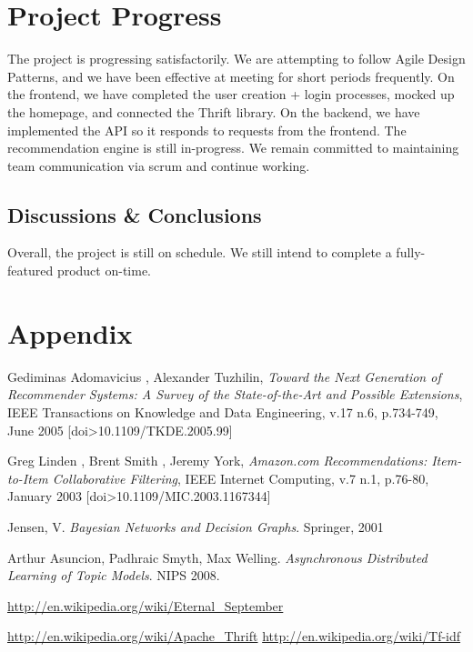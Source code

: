 \documentclass[11pt,letterpaper]{article}
\begin{document}
\section{Project Progress}
The project is progressing satisfactorily.
We are attempting to follow Agile Design Patterns, and we have been effective at meeting for short periods frequently.
On the frontend, we have completed the user creation + login processes, mocked up the homepage, and connected the Thrift library.
On the backend, we have implemented the API so it responds to requests from the frontend. The recommendation engine is still in-progress.
We remain committed to maintaining team communication via scrum and continue working.

\subsection{Discussions \& Conclusions}
Overall, the project is still on schedule. We still intend to complete a fully-featured product on-time.

\section{Appendix}

\newpage
\newpage
\begin{thebibliography}{6}
   Gediminas Adomavicius , Alexander Tuzhilin, \textit{Toward the Next Generation of Recommender Systems: A Survey of the State-of-the-Art and Possible Extensions}, IEEE Transactions on Knowledge and Data Engineering, v.17 n.6, p.734-749, June 2005  [doi>10.1109/TKDE.2005.99]

   Greg Linden , Brent Smith , Jeremy York, \textit{Amazon.com Recommendations: Item-to-Item Collaborative Filtering}, IEEE Internet Computing, v.7 n.1, p.76-80, January 2003  [doi>10.1109/MIC.2003.1167344]

   Jensen, V. \textit{Bayesian Networks and Decision Graphs}. Springer, 2001

   Arthur Asuncion, Padhraic Smyth, Max Welling. \textit{Asynchronous Distributed Learning of Topic Models}. NIPS 2008.

   \url{http://en.wikipedia.org/wiki/Eternal\_September}

   \url{http://en.wikipedia.org/wiki/Apache\_Thrift}
   \url{http://en.wikipedia.org/wiki/Tf-idf}


\end{thebibliography}
\end{document}
